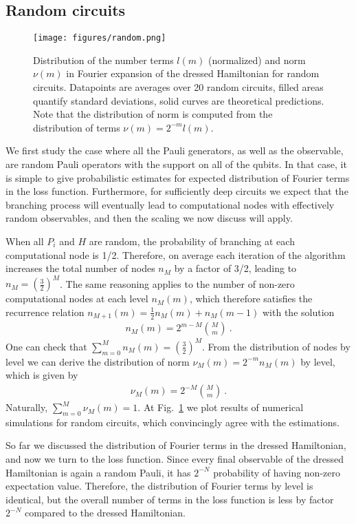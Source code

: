 \documentclass[twocolumn, amsfonts, amssymb, aps, nofootinbib]{revtex4-2}
\begin{document}
\subsection{Random circuits}
\begin{figure}
	\texttt{[image: figures/random.png]}
	\caption{Distribution of the number terms $l(m)$ (normalized) and norm $\nu(m)$ in Fourier expansion of the dressed Hamiltonian for random circuits. Datapoints are averages over 20 random circuits, filled areas quantify standard deviations, solid curves are theoretical predictions. Note that the distribution of norm is computed from the distribution of terms $\nu(m)=2^{-m}l(m)$.}
	\label{fig random}
\end{figure}
We first study the case where all the Pauli generators, as well as the observable, are random Pauli operators with the support on all of the qubits. In that case, it is simple to give probabilistic estimates for expected distribution of Fourier terms in the loss function. Furthermore, for sufficiently deep circuits we expect that the branching process will eventually lead to computational nodes with effectively random observables, and then the scaling we now discuss will apply.

When all $P_i$ and $H$ are random, the probability of branching at each computational node is 1/2. Therefore, on average each iteration of the algorithm increases the total number of nodes $n_M$ by a factor of 3/2, leading to $n_M=\left(\frac32\right)^M$. The same reasoning applies to the number of non-zero computational nodes at each level $n_{M}(m)$, which therefore satisfies the recurrence relation $n_{M+1}(m)=\frac12 n_{M}(m)+n_{M}(m-1)$ with the solution
\begin{align}
	n_{M}(m)=2^{m-M}\binom{M}{m} \ .
\end{align}
One can check that $\sum_{m=0}^M n_{M}(m)=\left(\frac32\right)^M$. From the distribution of nodes by level we can derive the distribution of norm $\nu_{M}(m)=2^{-m}n_{M}(m)$ by level, which is given by
\begin{align}
	\nu_{M}(m)=2^{-M}\binom{M}{m} \ . \label{binom}
\end{align}
Naturally, $\sum_{m=0}^M \nu_{M}(m)=1$. At Fig.~\ref{fig random} we plot results of numerical simulations for random circuits, which convincingly agree with the estimations. 


So far we discussed the distribution of Fourier terms in the dressed Hamiltonian, and now we turn to the loss function. Since every final observable of the dressed Hamiltonian is again a random Pauli, it has $2^{-N}$ probability of having non-zero expectation value. Therefore, the distribution of Fourier terms by level is identical, but the overall number of terms in the loss function is less by factor $2^{-N}$ compared to the dressed Hamiltonian.
\end{document}
